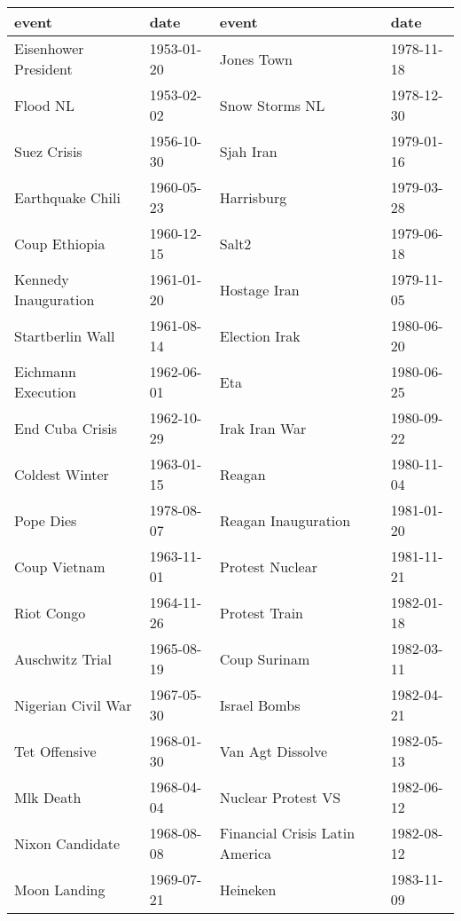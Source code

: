 \begin{tabular}{llll}
\toprule
                event &        date &                           event &        date \\
\midrule
 Eisenhower President &  1953-01-20 &                      Jones Town &  1978-11-18 \\
             Flood NL &  1953-02-02 &                  Snow Storms NL &  1978-12-30 \\
          Suez Crisis &  1956-10-30 &                       Sjah Iran &  1979-01-16 \\
     Earthquake Chili &  1960-05-23 &                      Harrisburg &  1979-03-28 \\
        Coup Ethiopia &  1960-12-15 &                           Salt2 &  1979-06-18 \\
 Kennedy Inauguration &  1961-01-20 &                    Hostage Iran &  1979-11-05 \\
     Startberlin Wall &  1961-08-14 &                   Election Irak &  1980-06-20 \\
   Eichmann Execution &  1962-06-01 &                             Eta &  1980-06-25 \\
      End Cuba Crisis &  1962-10-29 &                   Irak Iran War &  1980-09-22 \\
       Coldest Winter &  1963-01-15 &                          Reagan &  1980-11-04 \\
            Pope Dies &  1978-08-07 &             Reagan Inauguration &  1981-01-20 \\
         Coup Vietnam &  1963-11-01 &                 Protest Nuclear &  1981-11-21 \\
           Riot Congo &  1964-11-26 &                   Protest Train &  1982-01-18 \\
      Auschwitz Trial &  1965-08-19 &                    Coup Surinam &  1982-03-11 \\
   Nigerian Civil War &  1967-05-30 &                    Israel Bombs &  1982-04-21 \\
        Tet Offensive &  1968-01-30 &                Van Agt Dissolve &  1982-05-13 \\
            Mlk Death &  1968-04-04 &              Nuclear Protest VS &  1982-06-12 \\
      Nixon Candidate &  1968-08-08 &  Financial Crisis Latin America &  1982-08-12 \\
         Moon Landing &  1969-07-21 &                        Heineken &  1983-11-09 \\

\end{tabular}
